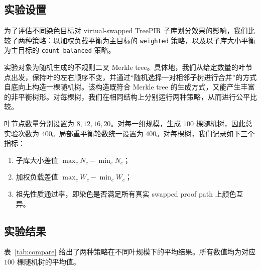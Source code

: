 \documentclass[UTF8]{ctexart}
\begin{document}
	\subsection{实验设置}
	
	为了评估不同染色目标对 virtual-swapped TreePIR 子库划分效果的影响，我们比较了两种策略：以加权负载平衡为主目标的 \texttt{weighted} 策略，以及以子库大小平衡为主目标的 \texttt{count\_balanced} 策略。
	
	实验对象为随机生成的不规则二叉 Merkle tree。具体地，我们从给定数量的叶节点出发，保持叶的左右顺序不变，并通过“随机选择一对相邻子树进行合并”的方式自底向上构造一棵随机树。该构造既符合 Merkle tree 的生成方式，又能产生丰富的非平衡树形。对每棵树，我们在相同结构上分别运行两种策略，从而进行公平比较。
	
	叶节点数量分别设置为 $8,12,16,20$。对每一组规模，生成 $100$ 棵随机树，因此总实验次数为 $400$。局部重平衡轮数统一设置为 $400$。对每棵树，我们记录如下三个指标：
	\begin{enumerate}[leftmargin=2em]
		\item 子库大小差值 $\max_c N_c - \min_c N_c$；
		\item 加权负载差值 $\max_c W_c - \min_c W_c$；
		\item 祖先性质通过率，即染色是否满足所有真实 swapped proof path 上颜色互异。
	\end{enumerate}
	
	\subsection{实验结果}
	
	表~\ref{tab:compare} 给出了两种策略在不同叶规模下的平均结果。所有数值均为对应 $100$ 棵随机树的平均值。
	
	\begin{table}[H]
		\centering
		\caption{两种染色策略在随机 Merkle tree 上的对比}
		\label{tab:compare}
		\small
		\setlength{\tabcolsep}{4pt}
	\end{table}
	
\end{document}
